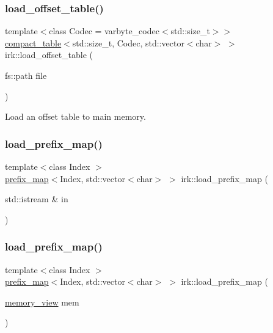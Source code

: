 \mbox{\label{namespaceirk_ad0428139c5d98f138321b9a2b1bff3d5}} 
\subsubsection{\texorpdfstring{load\+\_\+offset\+\_\+table()}{load\_offset\_table()}}
{\footnotesize\ttfamily template$<$class Codec  = varbyte\+\_\+codec$<$std\+::size\+\_\+t$>$$>$ \\
\mbox{\hyperlink{classirk_1_1compact__table}{compact\+\_\+table}}$<$std\+::size\+\_\+t, Codec, std\+::vector$<$char$>$ $>$ irk\+::load\+\_\+offset\+\_\+table (\begin{DoxyParamCaption}\item[{fs\+::path}]{file }\end{DoxyParamCaption})}



Load an offset table to main memory. 

\mbox{\label{namespaceirk_af1497304f9dcf5e7b72fcd6a6b607c22}} 
\subsubsection{\texorpdfstring{load\+\_\+prefix\+\_\+map()}{load\_prefix\_map()}\hspace{0.1cm}{\footnotesize\ttfamily [1/3]}}
{\footnotesize\ttfamily template$<$class Index $>$ \\
\mbox{\hyperlink{classirk_1_1prefix__map}{prefix\+\_\+map}}$<$Index, std\+::vector$<$char$>$ $>$ irk\+::load\+\_\+prefix\+\_\+map (\begin{DoxyParamCaption}\item[{std\+::istream \&}]{in }\end{DoxyParamCaption})}

\mbox{\label{namespaceirk_aeae3542b21a20bf6ff0b48555d1be556}} 
\subsubsection{\texorpdfstring{load\+\_\+prefix\+\_\+map()}{load\_prefix\_map()}\hspace{0.1cm}{\footnotesize\ttfamily [2/3]}}
{\footnotesize\ttfamily template$<$class Index $>$ \\
\mbox{\hyperlink{classirk_1_1prefix__map}{prefix\+\_\+map}}$<$Index, std\+::vector$<$char$>$ $>$ irk\+::load\+\_\+prefix\+\_\+map (\begin{DoxyParamCaption}\item[{\mbox{\hyperlink{classirk_1_1memory__view}{memory\+\_\+view}}}]{mem }\end{DoxyParamCaption})}

